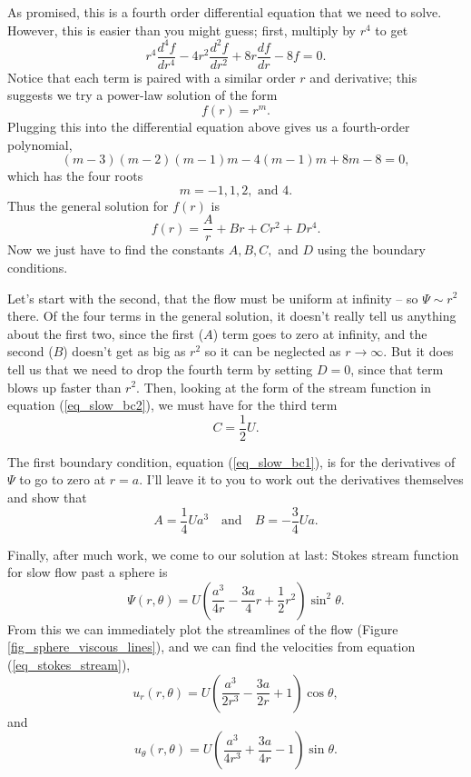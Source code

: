 As promised, this is a fourth order differential equation that we need to solve.  However, this is easier than you might guess; first, multiply by $r^4$ to get
\[
r^4 \frac{d^4f}{dr^4} - 4r^2 \frac{d^2f}{dr^2} + 8r \frac{df}{dr} - 8f = 0.
\]
Notice that each term is paired with a similar order $r$ and derivative; this suggests we try a power-law solution of the form 
\[
f(r) = r^m.
\]
Plugging this into the differential equation above gives us a fourth-order polynomial,
\[
(m-3)(m-2)(m-1)m - 4(m-1)m + 8m - 8 = 0,
\]
which has the four roots
\[
m = -1, 1, 2, \text{ and } 4.
\]
Thus the general solution for $f(r)$ is
\begin{equation}
f(r) = \frac{A}{r} + Br + Cr^2 + Dr^4.
\end{equation}
Now we just have to find the constants $A, B, C,$ and $D$ using the boundary conditions.

Let's start with the second, that the flow must be uniform at infinity -- so $\Psi \sim r^2$ there.  Of the four terms in the general solution, it doesn't really tell us anything about the first two, since the first ($A$) term goes to zero at infinity, and the second ($B$) doesn't get as big as $r^2$ so it can be neglected as $r\to\infty$.  But it does tell us that we need to drop the fourth term by setting $D = 0$, since that term blows up faster than $r^2$.  Then, looking at the form of the stream function in equation (\ref{eq_slow_bc2}), we must have for the third term
\[
C = \frac{1}{2}U.
\]

The first boundary condition, equation (\ref{eq_slow_bc1}), is for the derivatives of $\Psi$ to go to zero at $r=a$.  I'll leave it to you to work out the derivatives themselves and show that
\[
A = \frac{1}{4} Ua^3 \quad \text{and} \quad B = -\frac{3}{4} U a.
\]

Finally, after much work, we come to our solution at last:  Stokes stream function for slow flow past a sphere is
\begin{equation}
\boxed{
\Psi(r, \theta) = U \left( \frac{a^3}{4r} - \frac{3a}{4} r + \frac{1}{2} r^2 \right) \sin^2\theta.
}
\end{equation}
From this we can immediately plot the streamlines of the flow (Figure \ref{fig_sphere_viscous_lines}),  and we can find the velocities from equation (\ref{eq_stokes_stream}),
\begin{equation}
\label{eq_sphere_viscous_vel1}
u_r(r, \theta) = U \left( \frac{a^3}{2r^3} - \frac{3a}{2r} + 1 \right) \cos\theta,
\end{equation}
and
\begin{equation}
\label{eq_sphere_viscous_vel2}
u_\theta(r, \theta) = U \left( \frac{a^3}{4r^3} + \frac{3a}{4r} - 1 \right) \sin\theta.
\end{equation}


